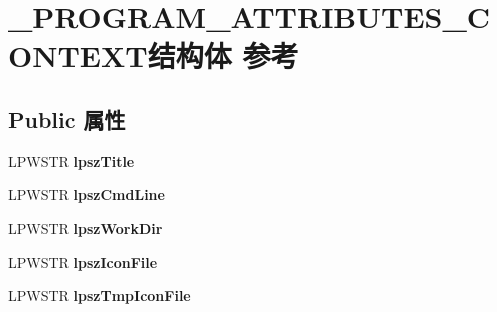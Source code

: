 \hypertarget{struct___p_r_o_g_r_a_m___a_t_t_r_i_b_u_t_e_s___c_o_n_t_e_x_t}{}\section{\+\_\+\+P\+R\+O\+G\+R\+A\+M\+\_\+\+A\+T\+T\+R\+I\+B\+U\+T\+E\+S\+\_\+\+C\+O\+N\+T\+E\+X\+T结构体 参考}
\label{struct___p_r_o_g_r_a_m___a_t_t_r_i_b_u_t_e_s___c_o_n_t_e_x_t}
\subsection*{Public 属性}
\begin{DoxyCompactItemize}
\item 
\mbox{\label{struct___p_r_o_g_r_a_m___a_t_t_r_i_b_u_t_e_s___c_o_n_t_e_x_t_ae5916f61a851bde847c26e402887c6c6}} 
L\+P\+W\+S\+TR {\bfseries lpsz\+Title}
\item 
\mbox{\label{struct___p_r_o_g_r_a_m___a_t_t_r_i_b_u_t_e_s___c_o_n_t_e_x_t_a6a00d0f9d58a74f3016acaac5ba592fb}} 
L\+P\+W\+S\+TR {\bfseries lpsz\+Cmd\+Line}
\item 
\mbox{\label{struct___p_r_o_g_r_a_m___a_t_t_r_i_b_u_t_e_s___c_o_n_t_e_x_t_add06916cf9db9ee57c5d3d7604292698}} 
L\+P\+W\+S\+TR {\bfseries lpsz\+Work\+Dir}
\item 
\mbox{\label{struct___p_r_o_g_r_a_m___a_t_t_r_i_b_u_t_e_s___c_o_n_t_e_x_t_a949565c6907e5d540da282a055302685}} 
L\+P\+W\+S\+TR {\bfseries lpsz\+Icon\+File}
\item 
\mbox{\label{struct___p_r_o_g_r_a_m___a_t_t_r_i_b_u_t_e_s___c_o_n_t_e_x_t_a6f3031fff9e9ca23c3ae641863457501}} 
L\+P\+W\+S\+TR {\bfseries lpsz\+Tmp\+Icon\+File}
\item 
\mbox{\label{struct___p_r_o_g_r_a_m___a_t_t_r_i_b_u_t_e_s___c_o_n_t_e_x_t_a2294a886e04e29bac9b5c765b6e6e7b4}} 

\end{DoxyCompactItemize}
